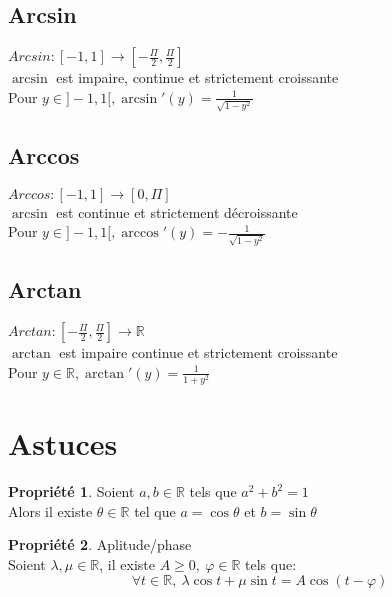 \documentclass[fleqn]{article}
\theoremstyle{definition} \newtheorem*{defi}{D\'efinition}
\theoremstyle{definition} \newtheorem*{theo}{Th\'eor\`eme}
\theoremstyle{definition} \newtheorem*{prop}{Propri\'et\'e}
\begin{document}
\subsection{Arcsin}
\(Arcsin: [-1,1] \rightarrow [-\frac{\Pi}{2}, \frac{\Pi}{2}]\) \\
\(\arcsin\) est impaire, continue et strictement croissante \\
Pour \(y \in ]-1,1[, \arcsin'(y) = \frac{1}{\sqrt{1-y^2}}\) \\

\subsection{Arccos}
\(Arccos: [-1,1] \rightarrow [0, \Pi]\) \\
\(\arcsin\) est continue et strictement d\'{e}croissante \\
Pour \(y \in ]-1,1[, \arccos'(y) = -\frac{1}{\sqrt{1-y^2}}\) \\

\subsection{Arctan}
\(Arctan: [-\frac{\Pi}{2},\frac{\Pi}{2}] \rightarrow \mathbb{R}\) \\
\(\arctan\) est impaire continue et strictement croissante \\
Pour \(y \in \mathbb{R}, \arctan'(y) = \frac{1}{1+y^2}\) \\

\section{Astuces}
\begin{prop} Soient $a,b \in \mathbb{R}$ tels que $a^2 + b^2 = 1$\\
	Alors il existe $\theta \in \mathbb{R}$ tel que $a = \cos \theta$ et $b = \sin \theta$
\end{prop}

\begin{prop} Aplitude/phase \\
	Soient $\lambda, \mu \in \mathbb{R}$, il existe $A \geq 0,\ \varphi \in \mathbb{R}$ tels que:
	\[\forall t \in \mathbb{R},\ \lambda \cos t + \mu \sin t = A\cos(t - \varphi)\]
\end{prop}
\end{document}
